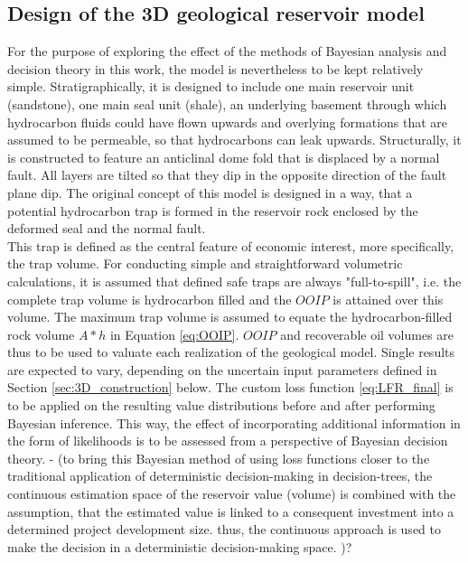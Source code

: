 		\subsection{Design of the 3D geological reservoir model}\label{sec:3D_design}
		For the purpose of exploring the effect of the methods of Bayesian analysis and decision theory in this work, the model is nevertheless to be kept relatively simple. Stratigraphically, it is designed to include one main reservoir unit (sandstone), one main seal unit (shale), an underlying basement through which hydrocarbon fluids could have flown upwards and overlying formations that are assumed to be permeable, so that hydrocarbons can leak upwards. Structurally, it is constructed to feature an anticlinal dome fold that is displaced by a normal fault. All layers are tilted so that they dip in the opposite direction of the fault plane dip. The original concept of this model is designed in a way, that a potential hydrocarbon trap is formed in the reservoir rock enclosed by the deformed seal and the normal fault.\\
		This trap is defined as the central feature of economic interest, more specifically, the trap volume. For conducting simple and straightforward volumetric calculations, it is assumed that defined safe traps are always "full-to-spill", i.e. the complete trap volume is hydrocarbon filled and the $OOIP$ is attained over this volume.
		The maximum trap volume is assumed to equate the hydrocarbon-filled rock volume $A * h$ in Equation \ref{eq:OOIP}. $OOIP$ and recoverable oil volumes are thus to be used to valuate each realization of the geological model. Single results are expected to vary, depending on the uncertain input parameters defined in Section \ref{sec:3D_construction} below. The custom loss function \ref{eq:LFR_final} is to be applied on the resulting value distributions before and after performing Bayesian inference. This way, the effect of incorporating additional information in the form of likelihoods is to be assessed from a perspective of Bayesian decision theory.
				- (to bring this Bayesian method of using loss functions closer to the traditional application of deterministic decision-making in decision-trees, the continuous estimation space of the reservoir value (volume) is combined with the assumption, that the estimated value is linked to a consequent investment into a determined project development size. thus, the continuous approach is used to make the decision in a deterministic decision-making space. )?

